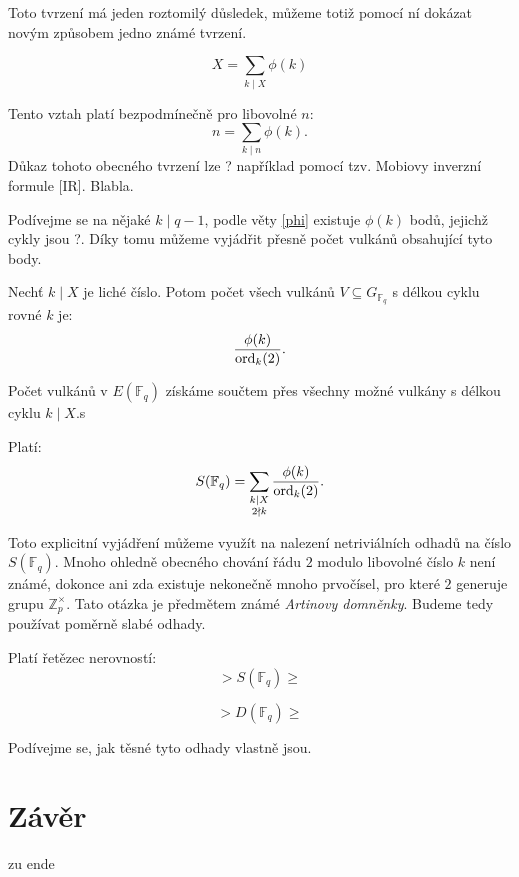 \documentclass[12pt]{report}
\begin{document}
Toto tvrzení má jeden roztomilý důsledek, můžeme totiž pomocí ní dokázat novým způsobem jedno známé tvrzení.

\begin{dusledek}
$$ X = \sum_{k \mid X} \phi(k)$$
\end{dusledek}

Tento vztah platí bezpodmínečně pro libovolné $n$:
$$n = \sum_{k \mid n} \phi(k).$$
Důkaz tohoto obecného tvrzení lze ? například pomocí tzv. Mobiovy inverzní formule [IR].  Blabla.

Podívejme se na nějaké $k \mid q-1$, podle věty \ref{phi} existuje $\phi(k)$ bodů, jejichž cykly jsou ?. Díky tomu můžeme vyjádřit přesně počet vulkánů obsahující tyto body.


\begin{dusledek}
Nechť $k \mid X$ je liché číslo.  Potom počet všech vulkánů $V \subseteq G_{\mathbb{F}_q}$ s délkou cyklu rovné $k$ je:
$$\frac{\phi(k)}{\operatorname{ord}_k (2)}.$$
\end{dusledek}

Počet vulkánů v $E(\mathbb{F}_q)$ získáme součtem přes všechny možné vulkány s délkou cyklu $k \mid X$.s

\begin{veta}
Platí:
$$S(\mathbb{F}_q) = \sum_{\substack{k \mid X \\ 2 \nmid k}} \frac{\phi(k)}{\operatorname{ord}_k (2)}.$$
\end{veta}

Toto explicitní vyjádření můžeme využít na nalezení netriviálních odhadů na číslo $S(\mathbb{F}_q)$. Mnoho ohledně obecného chování řádu $2$ modulo libovolné číslo $k$ není známé, dokonce ani zda existuje nekonečně mnoho prvočísel, pro které $2$ generuje grupu $\mathbb{Z}_{p} ^{\times}$. Tato otázka je předmětem známé \textit{Artinovy domněnky}. Budeme tedy používat poměrně slabé odhady.

\begin{veta} 
Platí řetězec nerovností:
$$ > S(\mathbb{F}_q) \geqslant$$
\end{veta}

\begin{dusledek}
$$ > D(\mathbb{F}_q) \geqslant$$
\end{dusledek}

Podívejme se, jak těsné tyto odhady vlastně jsou.





\chapter*{Závěr}
zu ende
\end{document}
